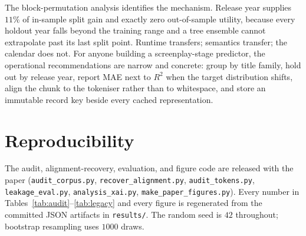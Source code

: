 \documentclass[conference,a4paper]{IEEEtran}
\begin{document}
The block-permutation analysis identifies the mechanism. Release year
supplies $11\%$ of in-sample split gain and exactly zero out-of-sample
utility, because every holdout year falls beyond the training range and a
tree ensemble cannot extrapolate past its last split point. Runtime
transfers; semantics transfer; the calendar does not. For anyone building
a screenplay-stage predictor, the operational recommendations are
narrow and concrete: group by title family, hold out by release year,
report MAE next to $R^{2}$ when the target distribution shifts, align the
chunk to the tokeniser rather than to whitespace, and store an immutable
record key beside every cached representation.

\section*{Reproducibility}

The audit, alignment-recovery, evaluation, and figure code are released
with the paper (\texttt{audit\_corpus.py}, \texttt{recover\_alignment.py},
\texttt{audit\_tokens.py}, \texttt{leakage\_eval.py},
\texttt{analysis\_xai.py}, \texttt{make\_paper\_figures.py}). Every
number in Tables~\ref{tab:audit}--\ref{tab:legacy} and every figure is
regenerated from the committed JSON artifacts in \texttt{results/}. The
random seed is $42$ throughout; bootstrap resampling uses $1000$ draws.
\end{document}
